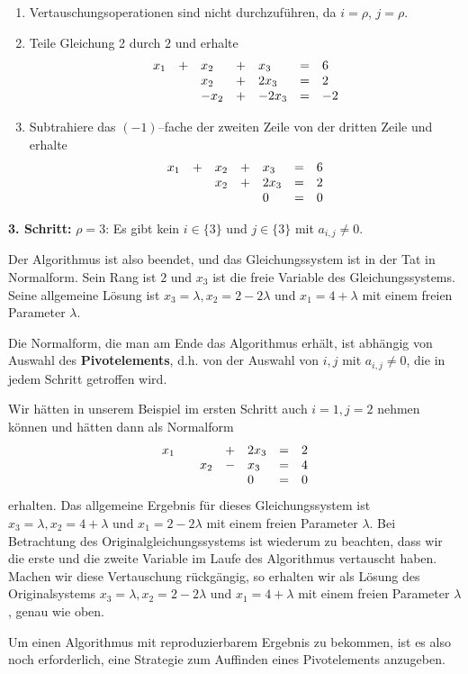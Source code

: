 \begin{beispiel}
\begin{enumerate}
\item Vertauschungsoperationen sind nicht durchzuführen, da $i = \rho$, $j = \rho$.
\item Teile Gleichung 2 durch $2$ und erhalte
  	$$ \begin{array} {l c l c l c  l}
  	x_1 & + & x_2 & + & x_3 & = & 6 \\
  	& & x_2 & + & 2 x_3 & = & 2 \\
  	&  & - x_2 & + & - 2 x_3 & = & -2
  	\end{array} $$
\item Subtrahiere das $(-1)$--fache der zweiten Zeile von der dritten Zeile und erhalte
  	$$ \begin{array} {l c l c l c  l}
  	x_1 & + & x_2 & + & x_3 & = & 6 \\
  	& & x_2 & + & 2 x_3 & = & 2 \\
  	&  &   &   & 0 & =&  0
 	\end{array} $$
\end{enumerate}

\textbf{3. Schritt:} $\rho = 3$: Es gibt kein $i \in \{3\}$ und $j \in \{ 3 \}$ mit $a_{i, j} \neq 0$. 

Der Algorithmus ist also beendet, und das Gleichungssystem ist in der Tat in Normalform. Sein Rang ist 
$2$ und $x_3$ ist die freie Variable des Gleichungssystems.  Seine allgemeine Lösung ist $x_3 = \lambda, 
x_2 = 2 - 2 \lambda$ und $x_1 = 4 + \lambda$ mit einem freien Parameter $\lambda$.
\end{beispiel}

\begin{notiz} Die Normalform, die man am Ende das Algorithmus erhält, ist abhängig von Auswahl des 
\textbf{Pivotelements}, 
d.h. von der Auswahl von $i, j$ mit $a_{i,j} \neq 0$, die in jedem Schritt getroffen wird. 

Wir hätten in unserem Beispiel im ersten Schritt auch $i = 1, j = 2$ nehmen können und hätten dann als
Normalform 
  	$$ \begin{array} {l c l c l c  l}
  	x_1 &   &   & + & 2 x_3 & = & 2 \\
  	& & x_2 & - &  x_3 & = & 4 \\
  	&  &   &   & 0 & = & 0
  	\end{array} $$
erhalten. Das allgemeine Ergebnis für dieses Gleichungssystem ist $x_3 = \lambda, x_2 = 4 + \lambda$ und 
$x_1 = 2 - 2 \lambda$ mit einem freien Parameter $\lambda$. Bei Betrachtung des Originalgleichungssystems ist 
wiederum zu beachten, dass wir die erste und die zweite Variable im Laufe des Algorithmus vertauscht haben. Machen 
wir diese Vertauschung rückgängig, so erhalten wir als Lösung des Originalsystems $x_3 = \lambda, x_2 = 
2 - 2 \lambda$ und $x_1 = 4 + \lambda$ mit einem freien Parameter $\lambda$, genau wie oben.   

Um einen Algorithmus mit reproduzierbarem Ergebnis zu bekommen, ist es also noch erforderlich, eine 
Strategie zum Auffinden eines Pivotelements anzugeben. 
\end{notiz} 

